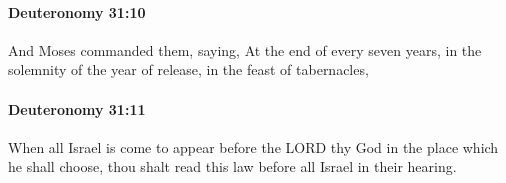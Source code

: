 		\paragraph{Deuteronomy 31:10} %
			\label{DEUTERONOMY-31-10}

			And Moses commanded them, saying, At the end of every seven years, in the solemnity of the year of release, in the feast of tabernacles,


		\paragraph{Deuteronomy 31:11} %
			\label{DEUTERONOMY-31-11}

			When all Israel is come to appear before the LORD thy God in the place which he shall choose, thou shalt read this law before all Israel in their hearing.


